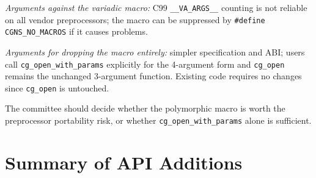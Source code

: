 \documentclass[11pt,letterpaper]{article}
\begin{document}
\begin{enumerate}[leftmargin=2em]
  \textit{Arguments against the variadic macro:} C99
  \texttt{\_\_VA\_ARGS\_\_} counting is not reliable on all vendor
  preprocessors; the macro can be suppressed by
  \texttt{\#define CGNS\_NO\_MACROS} if it causes problems.

  \textit{Arguments for dropping the macro entirely:} simpler
  specification and ABI; users call \texttt{cg\_open\_with\_params}
  explicitly for the 4-argument form and \texttt{cg\_open}
  remains the unchanged 3-argument function.  Existing code
  requires no changes since \texttt{cg\_open} is untouched.

  The committee should decide whether the polymorphic macro is
  worth the preprocessor portability risk, or whether
  \texttt{cg\_open\_with\_params} alone is sufficient.

\end{enumerate}

\section{Summary of API Additions}
\end{document}
